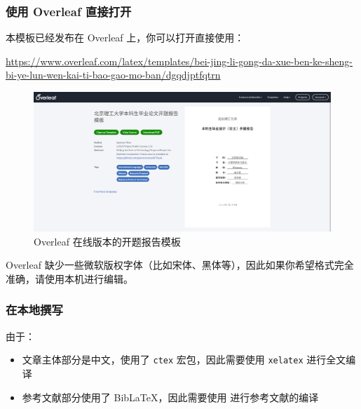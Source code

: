 \subsubsection{使用 Overleaf 直接打开}
本模板已经发布在 Overleaf 上，你可以打开直接使用：

\begin{center}
  \color{ForestGreen}\href{https://www.overleaf.com/latex/templates/bei-jing-li-gong-da-xue-ben-ke-sheng-bi-ye-lun-wen-kai-ti-bao-gao-mo-ban/dgqdjptfqtrn}{https://www.overleaf.com/latex/templates/bei-jing-li-gong-da-xue-ben-ke-sheng-bi-ye-lun-wen-kai-ti-bao-gao-mo-ban/dgqdjptfqtrn}
\end{center}

\begin{figure}[H]
  \centering
  \includegraphics[width=\textwidth]{images/overleaf.png}
  \caption{Overleaf 在线版本的开题报告模板}
\end{figure}

Overleaf 缺少一些微软版权字体（比如宋体、黑体等），因此如果你希望格式完全准确，请使用本机进行编辑。

\subsubsection{在本地撰写}
由于：

\begin{itemize}
  \item {\BIThesis} 文章主体部分是中文，使用了 \texttt{ctex} 宏包，因此需要使用 \texttt{xelatex} 进行全文编译
  \item 参考文献部分使用了 {Bib\LaTeX}，因此需要使用  进行参考文献的编译
\end{itemize}


